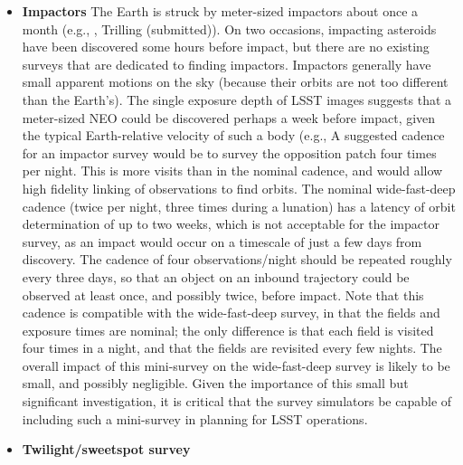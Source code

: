 \begin{itemize}
\item{{\bf Impactors}}
The Earth is struck by meter-sized impactors about
once a month (e.g., \citet{Boslough2015, 2017Icar..284..416T},
Trilling  (submitted)). 
On two occasions, impacting asteroids have
been discovered some hours before impact, but
there are no existing surveys that are dedicated to finding
impactors.
Impactors generally have small apparent motions
on the sky (because their orbits are not too different
than the Earth's). The single exposure depth of LSST
images suggests that a meter-sized NEO could be
discovered perhaps a week before impact, given
the typical Earth-relative velocity of such a body
(e.g., \citet{2017arXiv170506209C}
A suggested cadence for an impactor survey would be
to survey the opposition patch four times per night.
This is more visits than in the nominal cadence, and
would allow high fidelity linking of observations to
find orbits. The nominal wide-fast-deep cadence
(twice per night, three times during a lunation) has
a latency of orbit determination of up to two weeks,
which is not acceptable for the impactor survey, as an
impact would occur on a timescale of just a few days
from discovery.
The cadence of four observations/night should be repeated
roughly every three days, so that an object on an
inbound trajectory could be observed at least once,
and possibly twice, before impact.
Note that this cadence is compatible with
the wide-fast-deep survey, in that the fields and
exposure times are nominal; the only difference is that
each field is visited four times in a night, and that
the fields are revisited every few nights. The overall
impact of this mini-survey on the wide-fast-deep
survey is likely to be small, and possibly negligible.
Given the importance of this small but
significant investigation, it is critical that the
survey simulators be capable of including such
a mini-survey in planning for LSST operations.

\item{{\bf Twilight/sweetspot survey}}


\end{itemize}
